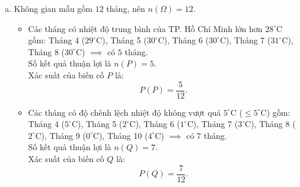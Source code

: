 \begin{bt}
{\begin{enumerate}[a)]
\begin{itemize}
    \end{itemize}
    Tổng độ chênh lệch nhiệt độ trong $12$ tháng là:
    $$10 + 10 + 8 + 5 + 2 + 1 + 3 + 2 + 0 + 4 + 7 + 9 = 61^\circ\text{C}.$$
    Độ chênh lệch nhiệt độ trung bình là:
    $$\dfrac{61}{12} \approx 5{,}08^\circ\text{C}.$$
    \item Không gian mẫu gồm $12$ tháng, nên $n(\Omega) = 12$.
    \begin{itemize}
        \item Các tháng có nhiệt độ trung bình của TP. Hồ Chí Minh lớn hơn $28^\circ\text{C}$ gồm: Tháng 4 ($29^\circ\text{C}$), Tháng 5 ($30^\circ\text{C}$), Tháng 6 ($30^\circ\text{C}$), Tháng 7 ($31^\circ\text{C}$), Tháng 8 ($30^\circ\text{C}$) $\implies$ có $5$ tháng.\\
        Số kết quả thuận lợi là $n(P) = 5$.\\
        Xác suất của biến cố $P$ là:
        $$P(P) = \dfrac{5}{12}.$$
        \item Các tháng có độ chênh lệch nhiệt độ không vượt quá $5^\circ\text{C}$ ($\le 5^\circ\text{C}$) gồm: Tháng 4 ($5^\circ\text{C}$), Tháng 5 ($2^\circ\text{C}$), Tháng 6 ($1^\circ\text{C}$), Tháng 7 ($3^\circ\text{C}$), Tháng 8 ($2^\circ\text{C}$), Tháng 9 ($0^\circ\text{C}$), Tháng 10 ($4^\circ\text{C}$) $\implies$ có $7$ tháng.\\
        Số kết quả thuận lợi là $n(Q) = 7$.\\
        Xác suất của biến cố $Q$ là:
        $$P(Q) = \dfrac{7}{12}.$$
    \end{itemize}
\end{enumerate}
}
\end{bt}

